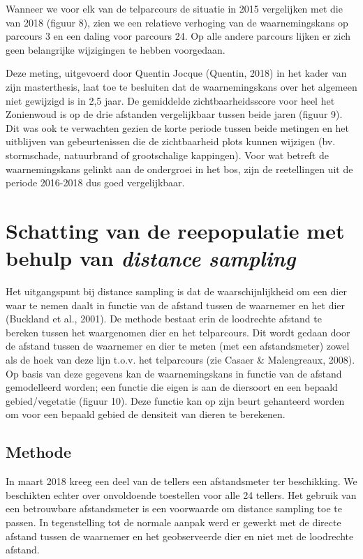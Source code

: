 \documentclass[twoside]{extreport}
\begin{document}
Wanneer we voor elk van de telparcours de situatie in 2015 vergelijken
met die van 2018 (figuur 8), zien we een relatieve verhoging van de
waarnemingskans op parcours 3 en een daling voor parcours 24. Op alle
andere parcours lijken er zich geen belangrijke wijzigingen te hebben
voorgedaan.

Deze meting, uitgevoerd door Quentin Jocque (Quentin, 2018) in het kader
van zijn masterthesis, laat toe te besluiten dat de waarnemingskans over
het algemeen niet gewijzigd is in 2,5 jaar. De gemiddelde
zichtbaarheidsscore voor heel het Zonienwoud is op de drie afstanden
vergelijkbaar tussen beide jaren (figuur 9). Dit was ook te verwachten
gezien de korte periode tussen beide metingen en het uitblijven van
gebeurtenissen die de zichtbaarheid plots kunnen wijzigen (bv.
stormschade, natuurbrand of grootschalige kappingen). Voor wat betreft
de waarnemingskans gelinkt aan de ondergroei in het bos, zijn de
reetellingen uit de periode 2016-2018 dus goed vergelijkbaar.

\chapter{\texorpdfstring{Schatting van de reepopulatie met behulp van
\emph{distance
sampling}}{Schatting van de reepopulatie met behulp van distance sampling}}\label{schatting-van-de-reepopulatie-met-behulp-van-distance-sampling}

Het uitgangspunt bij distance sampling is dat de waarschijnlijkheid om
een dier waar te nemen daalt in functie van de afstand tussen de
waarnemer en het dier (Buckland et al., 2001). De methode bestaat erin
de loodrechte afstand te bereken tussen het waargenomen dier en het
telparcours. Dit wordt gedaan door de afstand tussen de waarnemer en
dier te meten (met een afstandsmeter) zowel als de hoek van deze lijn
t.o.v. het telparcours (zie Casaer \& Malengreaux, 2008). Op basis van
deze gegevens kan de waarnemingskans in functie van de afstand
gemodelleerd worden; een functie die eigen is aan de diersoort en een
bepaald gebied/vegetatie (figuur 10). Deze functie kan op zijn beurt
gehanteerd worden om voor een bepaald gebied de densiteit van dieren te
berekenen.

\section{Methode}\label{methode}

In maart 2018 kreeg een deel van de tellers een afstandsmeter ter
beschikking. We beschikten echter over onvoldoende toestellen voor alle
24 tellers. Het gebruik van een betrouwbare afstandsmeter is een
voorwaarde om distance sampling toe te passen. In tegenstelling tot de
normale aanpak werd er gewerkt met de directe afstand tussen de
waarnemer en het geobserveerde dier en niet met de loodrechte afstand.
\end{document}
